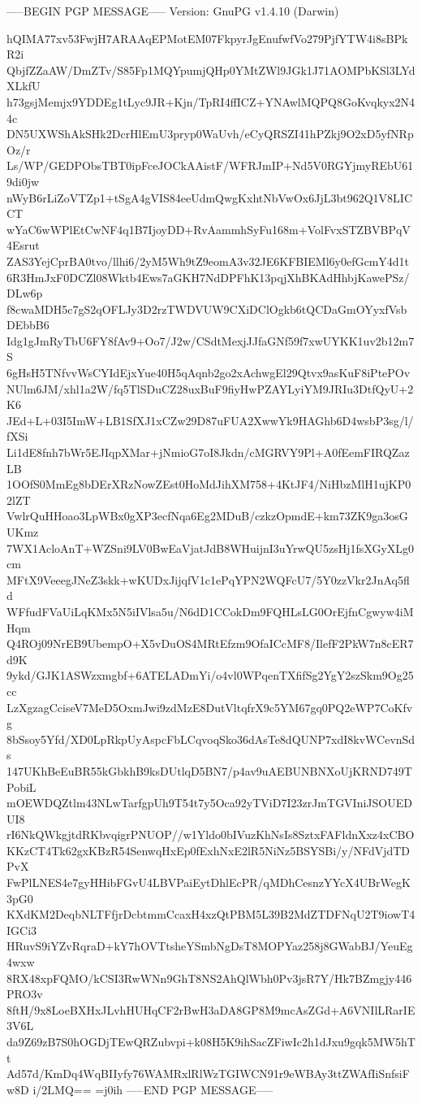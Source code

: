 -----BEGIN PGP MESSAGE-----
Version: GnuPG v1.4.10 (Darwin)

hQIMA77xv53FwjH7ARAAqEPMotEM07FkpyrJgEnufwfVo279PjfYTW4i8sBPkR2i
QbjfZZaAW/DmZTv/S85Fp1MQYpumjQHp0YMtZWl9JGk1J71AOMPbKSl3LYdXLkfU
h73gsjMemjx9YDDEg1tLyc9JR+Kjn/TpRI4ffICZ+YNAwlMQPQ8GoKvqkyx2N44c
DN5UXWShAkSHk2DcrHlEmU3pryp0WaUvh/eCyQRSZI41hPZkj9O2xD5yfNRpOz/r
Ls/WP/GEDPObsTBT0ipFceJOCkAAistF/WFRJmIP+Nd5V0RGYjmyREbU619di0jw
nWyB6rLiZoVTZp1+tSgA4gVIS84eeUdmQwgKxhtNbVwOx6JjL3bt962Q1V8LICCT
wYaC6wWPlEtCwNF4q1B7IjoyDD+RvAammhSyFu168m+VolFvxSTZBVBPqV4Esrut
ZAS3YejCprBA0tvo/llhi6/2yM5Wh9tZ9eomA3v32JE6KFBIEMl6y0efGcmY4d1t
6R3HmJxF0DCZl08Wktb4Ews7aGKH7NdDPFhK13pqjXhBKAdHhbjKawePSz/DLw6p
f8cwaMDH5c7gS2qOFLJy3D2rzTWDVUW9CXiDClOgkb6tQCDaGmOYyxfVsbDEbbB6
Idg1gJmRyTbU6FY8fAv9+Oo7/J2w/CSdtMexjJJfaGNf59f7xwUYKK1uv2b12m7S
6gHsH5TNfvvWsCYIdEjxYue40H5qAqnb2go2xAchwgEl29Qtvx9asKuF8iPtePOv
NUlm6JM/xhl1a2W/fq5TlSDuCZ28uxBuF9fiyHwPZAYLyiYM9JRIu3DtfQyU+2K6
JEd+L+03I5ImW+LB1SfXJ1xCZw29D87uFUA2XwwYk9HAGhb6D4wsbP3sg/l/fXSi
Li1dE8fnh7bWr5EJIqpXMar+jNmioG7oI8Jkdn/cMGRVY9Pl+A0fEemFIRQZazLB
1OOfS0MmEg8bDErXRzNowZEst0HoMdJihXM758+4KtJF4/NiHbzMlH1ujKP02lZT
VwlrQuHHoao3LpWBx0gXP3ecfNqa6Eg2MDuB/czkzOpmdE+km73ZK9ga3osGUKmz
7WX1AcloAnT+WZSni9LV0BwEaVjatJdB8WHuijnI3uYrwQU5zsHj1fsXGyXLg0cm
MFtX9VeeegJNeZ3skk+wKUDxJijqfV1c1ePqYPN2WQFcU7/5Y0zzVkr2JnAq5fld
WFfudFVaUiLqKMx5N5iIVlsa5u/N6dD1CCokDm9FQHLsLG0OrEjfnCgwyw4iMHqm
Q4ROj09NrEB9UbempO+X5vDuOS4MRtEfzm9OfaICcMF8/IlefF2PkW7n8cER7d9K
9ykd/GJK1ASWzxmgbf+6ATELADmYi/o4vl0WPqenTXfifSg2YgY2szSkm9Og25cc
LzXgzagCciseV7MeD5OxmJwi9zdMzE8DutVltqfrX9c5YM67gq0PQ2eWP7CoKfvg
8bSsoy5Yfd/XD0LpRkpUyAspcFbLCqvoqSko36dAsTe8dQUNP7xdI8kvWCevnSds
147UKhBeEuBR55kGbkhB9ksDUtlqD5BN7/p4av9uAEBUNBNXoUjKRND749TPobiL
mOEWDQZtlm43NLwTarfgpUh9T54t7y5Oca92yTViD7I23zrJmTGVIniJSOUEDUI8
rI6NkQWkgjtdRKbvqigrPNUOP//w1Yldo0bIVuzKhNsIs8SztxFAFldnXxz4xCBO
KKzCT4Tk62gxKBzR54SenwqHxEp0fExhNxE2lR5NiNz5BSYSBi/y/NFdVjdTDPvX
FwPlLNES4e7gyHHibFGvU4LBVPaiEytDhlEcPR/qMDhCesnzYYcX4UBrWegK3pG0
KXdKM2DeqbNLTFfjrDcbtmmCcaxH4xzQtPBM5L39B2MdZTDFNqU2T9iowT4IGCi3
HRuvS9iYZvRqraD+kY7hOVTtsheYSmbNgDsT8MOPYaz258j8GWabBJ/YeuEg4wxw
8RX48xpFQMO/kCSI3RwWNn9GhT8NS2AhQlWbh0Pv3jsR7Y/Hk7BZmgjy446PRO3v
8ftH/9x8LoeBXHxJLvhHUHqCF2rBwH3aDA8GP8M9mcAsZGd+A6VNIlLRarIE3V6L
da9Z69zB7S0hOGDjTEwQRZubvpi+k08H5K9ihSacZFiwIc2h1dJxu9gqk5MW5hTt
Ad57d/KmDq4WqBIIyfy76WAMRxlRlWzTGIWCN91r9eWBAy3ttZWAfIiSnfsiFw8D
i/2LMQ==
=j0ih
-----END PGP MESSAGE-----
